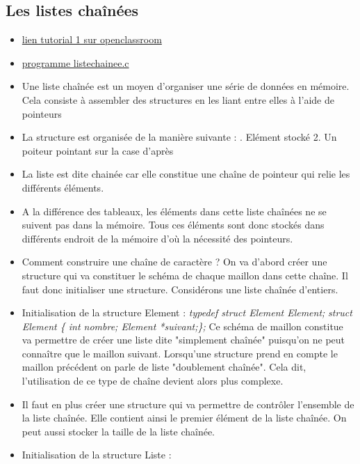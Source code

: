 \documentclass[12pt,a4paper]{article}
\begin{document}
\subsection{Les listes chaînées}
\begin{itemize}
\item \href{https://openclassrooms.com/fr/courses/19980-apprenez-a-programmer-en-c/19733-les-listes-chainees}{lien  tutorial 1 sur openclassroom}
\item \href{run:../Test C/}{programme liste\textunderscore chainee.c}
\item Une liste chaînée est un moyen d'organiser une série de données en mémoire. Cela consiste à assembler des structures en les liant entre elles à l'aide de pointeurs
\item La structure est organisée de la manière suivante :
. Elément stocké 2. Un poiteur pointant sur la case d'après
\item La liste est dite chainée car elle constitue une chaîne de pointeur qui relie les différents éléments.
\item A la différence des tableaux, les éléments dans cette liste chaînées ne se suivent pas dans la mémoire. Tous ces éléments sont donc stockés dans différents endroit de la mémoire d'où la nécessité des pointeurs.
\item Comment construire une chaîne de caractère ? On va d'abord créer une structure qui va constituer le schéma de chaque maillon dans cette chaîne. Il faut donc initialiser une structure. Considérons une liste chaînée d'entiers.
\item Initialisation de la structure Element : 
\newline \textit{typedef struct Element Element;}
\newline \textit{struct Element \{ int nombre; Element *suivant;\};}
\newline Ce schéma de maillon constitue va permettre de créer une liste dite "simplement chaînée" puisqu'on ne peut connaître que le maillon suivant. Lorsqu'une structure prend en compte le maillon précédent on parle de liste "doublement chaînée". Cela dit, l'utilisation de ce type de chaîne devient alors plus complexe.
\item Il faut en plus créer une structure qui va permettre de contrôler l'ensemble de la liste chaînée. Elle contient ainsi le premier élément de la liste chaînée. On peut aussi stocker la taille de la liste chaînée.
\item Initialisation de la structure Liste :

\end{itemize}
\end{document}
